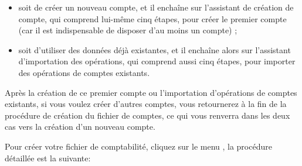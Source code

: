 \begin{itemize}
	\item  soit de créer un nouveau compte, et il enchaîne sur l'assistant de création de compte, qui comprend lui-même cinq étapes, pour créer le premier compte (car il est indispensable de disposer d'au moins un compte) ;
	\item soit d'utiliser des données déjà existantes, et il enchaîne alors sur l'assistant d'importation des opérations, qui comprend aussi cinq étapes, pour importer des opérations de comptes existants.
\end{itemize}

Après la création de ce premier compte ou l'importation d'opérations de comptes existants, si vous voulez créer d'autres comptes, vous retournerez à la fin de la procédure de création du fichier de comptes, ce qui vous renverra dans les deux cas vers la création d'un nouveau compte.

Pour créer votre fichier de comptabilité, cliquez sur le menu , la procédure détaillée est la suivante:

